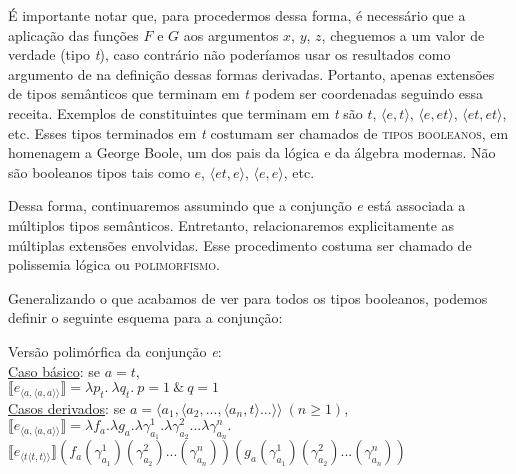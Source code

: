 \n É importante notar que, para
procedermos dessa forma, é necessário que a aplicação das funções $F$ e $G$  aos argumentos $x$, $y$, $z$, cheguemos a um valor de verdade (tipo
\textit{t}), caso contrário não poderíamos usar os resultados como argumento de  na definição dessas formas derivadas. Portanto, apenas extensões de tipos semânticos
que terminam em \textit{t} podem ser coordenadas seguindo essa
receita. Exemplos de constituintes que terminam em \textit{t} são
$t$, $\langle e,t\rangle$, $\langle e,et\rangle$, $\langle
et,et\rangle$, etc. Esses tipos terminados em \textit{t}
costumam ser chamados de \textsc{tipos booleanos}, em homenagem a George Boole, um dos pais da lógica e da álgebra modernas. Não são
booleanos tipos tais como $e$, $\langle et,e\rangle$, $\langle
e,e\rangle$, etc.


Dessa forma, continuaremos assumindo que a conjun\-ção \textit{e} está associada a
múltiplos tipos semânticos. Entretanto, relacionaremos explicitamente as múltiplas extensões envolvidas. Esse procedimento costuma ser chamado de polissemia lógica ou \textsc{polimorfismo}.

Generalizando o que acabamos de ver para todos os tipos booleanos, podemos definir o seguinte esquema para a conjunção:

\begin{exe}
	\ex Versão polimórfica da conjun\-ção \textit{e}: \\
	\hspace*{18pt}\underline{Caso básico}: se $a = t$, \\
	\hspace*{30pt}$\llbracket e_{\langle a ,\langle a,a\rangle\rangle}\rrbracket = \lambda p_{t}.\ \lambda q_{t}.\ p=1\ \&\ q=1$ \\ 
	\hspace*{18pt}\underline{Casos derivados}: se $a = \langle a_{1},\langle a_{2}, ... ,\langle a_{n},t\rangle ... \rangle\rangle\ (n\geq 1)$, \\
	\hspace*{30pt} $\llbracket e_{\langle a ,\langle a,a\rangle\rangle}\rrbracket = \lambda f_{a}.\lambda g_{a}.\lambda \gamma_{a_{1}}^{1}.\lambda \gamma_{a_{2}}^{2}...\lambda \gamma_{a_{n}}^{n}.$\\ \hspace*{\fill} $\llbracket e_{\langle t\langle t,t\rangle\rangle}\rrbracket(f_{a}(\gamma_{a_{1}}^{1})(\gamma_{a_{2}}^{2})...(\gamma_{a_{n}}^{n}))(g_{a}(\gamma_{a_{1}}^{1})(\gamma_{a_{2}}^{2})...(\gamma_{a_{n}}^{n}))$
\end{exe}


